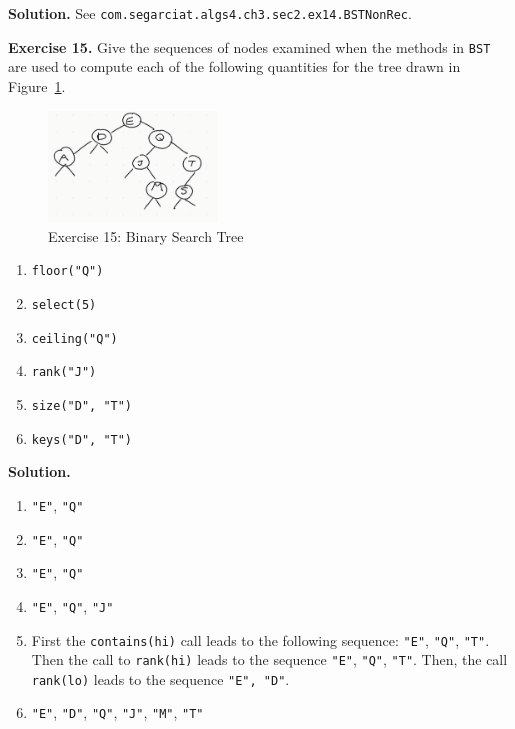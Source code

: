 \documentclass[12pt, a4paper]{article}
\newenvironment{ex}[2][Exercise]
{\par\medskip\noindent \textbf{#1 #2.}}
{\medskip}
\newenvironment{sol}[1][Solution]
{\par\medskip\noindent \textbf{#1.} }
{\medskip}
\begin{document}
	\begin{sol}
		See \texttt{com.segarciat.algs4.ch3.sec2.ex14.BSTNonRec}.
	\end{sol}
	\begin{ex}{15}
		Give the sequences of nodes examined when the methods in \texttt{BST} are used to
		compute each of the following quantities for the tree drawn in Figure~\ref{fig:ex-15}.
		\begin{figure}
			\centering
			\includegraphics[width=0.4\textwidth]{exercise-15}
			\caption{Exercise 15: Binary Search Tree}
			\label{fig:ex-15}
		\end{figure}
		\begin{enumerate}[label=(\alph*)]
			\item \texttt{floor("Q")}
			\item \texttt{select(5)}
			\item \texttt{ceiling("Q")}
			\item \texttt{rank("J")}
			\item \texttt{size("D", "T")}
			\item \texttt{keys("D", "T")}
		\end{enumerate}
	\end{ex}
	\begin{sol}
		\begin{enumerate}[label=(\alph*)]
			\item \texttt{"E"}, \texttt{"Q"}
			\item \texttt{"E"}, \texttt{"Q"}
			\item \texttt{"E"}, \texttt{"Q"}
			\item \texttt{"E"}, \texttt{"Q"}, \texttt{"J"}
			\item First the \texttt{contains(hi)} call leads to the following
			sequence: \texttt{"E"}, \texttt{"Q"}, \texttt{"T"}. Then the call
			to \texttt{rank(hi)} leads to the sequence \texttt{"E"}, \texttt{"Q"},
			\texttt{"T"}. Then, the call \texttt{rank(lo)} leads to the sequence
			\texttt{"E", "D"}.
			\item \texttt{"E"}, \texttt{"D"}, \texttt{"Q"}, \texttt{"J"}, \texttt{"M"},
			\texttt{"T"}
		\end{enumerate}
	\end{sol}
\end{document}
